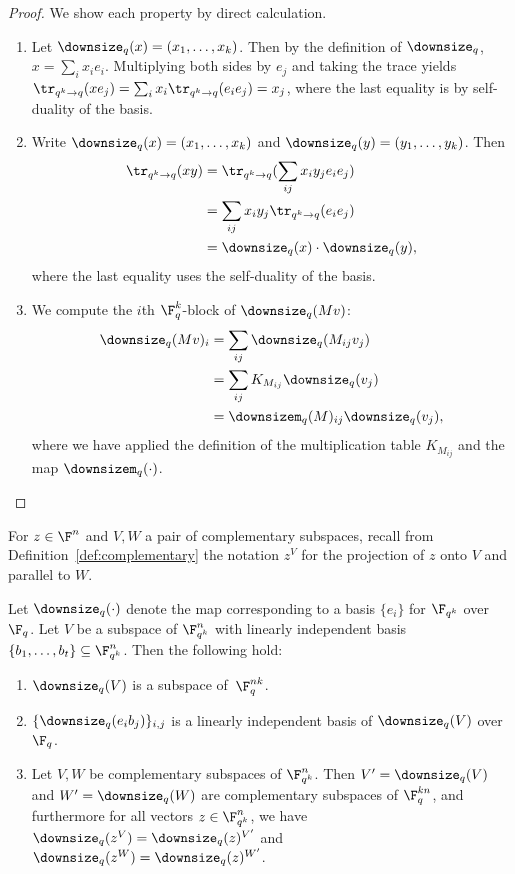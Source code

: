 \begin{proof}
  We show each property by direct calculation.
  \begin{enumerate}
    \item Let $\downsize_q(x) = (x_1, \dots, x_k)$. Then by the definition of
    $\downsize_q$, $x = \sum_i x_i e_i$. Multiplying both sides by $e_j$
    and taking the trace yields $\tr_{q^k \to q}(x e_j) = \sum_i x_i
    \tr_{q^k \to q}(e_i e_j) = x_j$, where the last equality is by
    self-duality of the basis.
    \item Write $\downsize_q(x) = (x_1, \dots, x_k)$ and $\downsize_q(y) =
      (y_1, \dots, y_k)$. Then
      \begin{align*}
        \tr_{q^k \to q} (xy) &= \tr_{q^k \to q}(\sum_{ij} x_i y_j e_i
                               e_j) \\
                             &= \sum_{ij} x_i y_j \tr_{q^k \to q}(  e_i
                               e_j) \\
                             &= \downsize_q(x) \cdot \downsize_q(y),
      \end{align*}
      where the last equality uses the self-duality of the basis.
    \item
      We compute the $i$th $\F_q^k$-block of $\downsize_q(Mv)$:
      \begin{align*}
        \downsize_q(Mv)_i &= \sum_{ij} \downsize_q(M_{ij} v_j) \\
                          &= \sum_{ij} K_{M_{ij}} \downsize_q(v_j) \\
                          &= \downsizem_q(M)_{ij} \downsize_q(v_j) ,
      \end{align*}
      where we have applied the definition of the multiplication table
      $K_{M_{ij}}$ and the map $\downsizem_q(\cdot)$.
  \end{enumerate}
\end{proof}

For $z\in \F^n$ and $V,W$ a pair of complementary subspaces, recall from
Definition~\ref{def:complementary} the notation $z^V$ for the projection of $z$
onto $V$ and parallel to $W$.

\begin{lemma}
  \label{lem:downsize_subspace}
  Let $\downsize_q(\cdot)$ denote the map corresponding to a
  basis $\{e_i\}$ for $\F_{q^k}$ over $\F_q$.
  Let $V$ be a subspace of $\F_{q^k}^n$ with linearly independent basis
  $\{b_1,\ldots,b_t\} \subseteq \F_{q^k}^n$.
  Then the following hold:
  \begin{enumerate}
 	\item $\downsize_q(V)$ is a subspace of $\,\F_{q}^{nk}$.
	\item $\{ \downsize_q(e_i b_j) \}_{i,j}$ is a linearly independent basis of
    $\downsize_q(V)$ over $\F_q$.
	\item Let $V, W$ be complementary subspaces of $\F_{q^k}^n$.
    Then $V' = \downsize_q(V)$ and $W' = \downsize_q(W)$ are complementary
    subspaces of $\F_q^{kn}$, and furthermore for all vectors $z \in
    \F_{q^k}^n$, we have $\downsize_q(z^V) = \downsize_q(z)^{V'}$ and
    $\downsize_q(z^W) = \downsize_q(z)^{W'}$.
  \end{enumerate}
\end{lemma}

